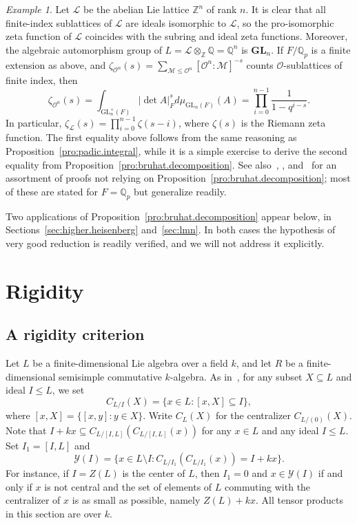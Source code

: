 \documentclass[11pt,a4paper]{amsart}
\theoremstyle{plain}
\theoremstyle{remark}
\newtheorem{exm}[thm]{Example}
\newcommand{\Z}{\mathbb{Z}}
\newcommand{\Q}{\mathbb{Q}}
\newcommand{\tensor}{\otimes}
\newcommand{\dimL}{n}
\begin{document}
\begin{exm} \label{exm:abelian}
Let $\mathcal{L}$ be the abelian Lie lattice $\Z^{\dimL}$ of rank $\dimL$.  It is clear that all finite-index sublattices of $\mathcal{L}$ are ideals isomorphic to $\mathcal{L}$, so the pro-isomorphic zeta function of $\mathcal{L}$ coincides with the subring and ideal zeta functions.  Moreover, the algebraic automorphism group of $L = \mathcal{L} \tensor_\Z \Q = \Q^{\dimL}$ is $\mathbf{GL}_{\dimL}$.  If $F / \Q_p$ is a finite extension as above, and $\zeta_{\mathcal{O}^\dimL}(s) = \sum_{\mathcal{M} \leq \mathcal{O}^\dimL} [\mathcal{O}^\dimL : \mathcal{M}]^{-s}$ counts $\mathcal{O}$-sublattices of finite index, then
\begin{equation*} 
\zeta_{\mathcal{O}^\dimL}(s) = \int_{\mathrm{GL}_{\dimL}^+(F)} | \det A |^{s}_{F} d \mu_{\mathrm{GL}_n(F)} (A) = \prod_{i = 0}^{\dimL - 1} \frac{1}{1 - q^{i - s}}.
\end{equation*}
In particular, $\zeta_{\mathcal{L}}(s) = \prod_{i = 0}^{\dimL - 1} \zeta(s - i)$, where $\zeta(s)$ is the Riemann zeta function.
The first equality above follows from the same reasoning as Proposition~\ref{pro:padic.integral}, while
it is a simple exercise to derive the second equality from Proposition~\ref{pro:bruhat.decomposition}.  See also~\cite[Proposition~1.1]{GSS/88}, \cite[Theorem~15.1]{LubotzkySegal/03}, and~\cite[Example~2.19]{Voll/Newcomer} for an assortment of proofs not relying on Proposition~\ref{pro:bruhat.decomposition}; most of these are stated for $F = \Q_p$ but generalize readily.
\end{exm}

Two applications of Proposition~\ref{pro:bruhat.decomposition} appear below, in Sections~\ref{sec:higher.heisenberg} and~\ref{sec:lmn}.  In both cases the hypothesis of very good reduction is readily verified, and we will not address it explicitly.

\section{Rigidity} \label{sec:rigidity}
\subsection{A rigidity criterion}
Let $L$ be a finite-dimensional Lie algebra over a field $k$, and let $R$ be a finite-dimensional semisimple commutative $k$-algebra.  As in~\cite{Segal/89}, for any subset $X \subseteq L$ and ideal $I \leq L$, we set
$$C_{L/I}(X) = \{ x \in L : [x,X] \subseteq I \},$$
where $[x,X] = \{ [x,y] : y \in X \}$.
Write $C_L(X)$ for the centralizer $C_{L/(0)}(X)$.
Note that $I + kx \subseteq C_{L/[I,L]}(C_{L/[I,L]}(x))$ for any $x \in L$ and any ideal $I \leq L$.
Set $I_1 = [I,L]$ and
\begin{equation} \label{equ:yz.def} 
\mathcal{Y}(I) = \{ x \in L \setminus I : C_{L / I_1} (C_{L / I_1} (x)) = I + kx \}.
\end{equation}
For instance, if $I = Z(L)$ is the center of $L$, then $I_1 = 0$ and $x \in \mathcal{Y}(I)$ if and only if $x$ is not central and the set of elements of $L$ commuting with the centralizer of $x$ is as small as possible, namely $Z(L) + kx$.  All tensor products in this section are over $k$.  
\end{document}
